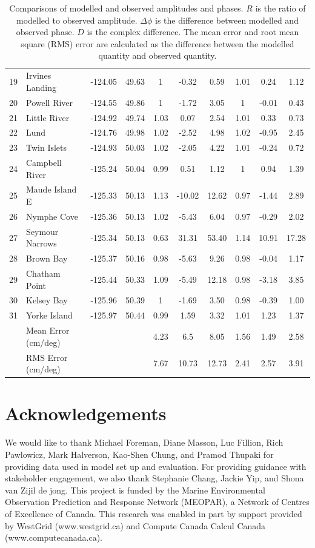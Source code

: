 \documentclass[pdftex,10pt]{article}
\begin{document}
\begin{table}[h]
\begin{tabular}{l l l l c c c c c c}
19 & Irvines Landing & -124.05 & 49.63 & 1 & -0.32 & 0.59  & 1.01 & 0.24 & 1.12 \\
20 & Powell River & -124.55 & 49.86 & 1 & -1.72 & 3.05  & 1 & -0.01 & 0.43 \\
21 & Little River & -124.92 & 49.74 & 1.03 & 0.07 & 2.54  & 1.01 & 0.33 & 0.73\\ 
22 & Lund & -124.76 & 49.98 & 1.02 & -2.52 & 4.98  & 1.02 & -0.95 & 2.45 \\
23 & Twin Islets & -124.93 & 50.03 & 1.02 & -2.05 & 4.22  & 1.01 & -0.24 & 0.72\\ 
24 & Campbell River & -125.24 & 50.04 & 0.99 & 0.51 & 1.12  & 1 & 0.94 & 1.39 \\
25 & Maude Island E & -125.33 & 50.13 & 1.13 & -10.02 & 12.62  & 0.97 & -1.44 & 2.89\\ 
26 & Nymphe Cove & -125.36 & 50.13 & 1.02 & -5.43 & 6.04  & 0.97 & -0.29 & 2.02 \\
27 & Seymour Narrows & -125.34 & 50.13 & 0.63 & 31.31 & 53.40  & 1.14 & 10.91 & 17.28 \\
28 & Brown Bay & -125.37 & 50.16 & 0.98 & -5.63 & 9.26  & 0.98 & -0.04 & 1.17 \\
29 & Chatham Point & -125.44 & 50.33 & 1.09 & -5.49 & 12.18  & 0.98 & -3.18 & 3.85 \\
30 & Kelsey Bay & -125.96 & 50.39 & 1 & -1.69 & 3.50  & 0.98 & -0.39 & 1.00 \\
31 & Yorke Island & -125.97 & 50.44 & 0.99 & 1.59 & 3.32  & 1.01 & 1.23 & 1.37\\ 
\hline 
&   Mean Error (cm/deg) & & & 4.23  & 6.5 & 8.05   & 1.56 & 1.49 & 2.58 \\
&   RMS Error (cm/deg)  & & & 7.67  & 10.73 & 12.73 & 2.41 & 2.57 & 3.91 \\
\hline  
\end{tabular}
\caption{Comparisons of modelled and observed amplitudes and phases. $R$ is the ratio of modelled to observed amplitude. $\Delta \phi$ is the difference between modelled and observed phase. $D$ is the complex difference. The mean error and root mean square (RMS) error are calculated as the difference between the modelled quantity and observed quantity. }
\label{tab:comparison} 
\end{table}


\section{Acknowledgements}\label{sec:ack}
We would like to thank Michael Foreman, Diane Masson, Luc Fillion, Rich Pawlowicz, Mark Halverson, Kao-Shen Chung, and Pramod Thupaki for providing data used in model set up and evaluation. For providing guidance with stakeholder engagement, we also thank Stephanie Chang, Jackie Yip, and Shona van Zijil de jong. This project is funded by the Marine Environmental Observation Prediction and Response Network (MEOPAR), a Network of Centres of Excellence of Canada. This research was enabled in part by support provided by WestGrid (www.westgrid.ca) and Compute Canada Calcul Canada (www.computecanada.ca).




\end{document}

